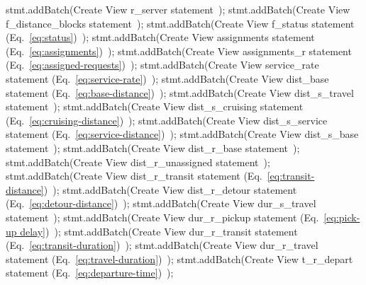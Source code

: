 \documentclass{article}
\theoremstyle{definition}                   %
\begin{document}
    stmt.addBatch(\LA{}Create View r\_server statement~{\nwtagstyle{}}\RA{});
    stmt.addBatch(\LA{}Create View f\_distance\_blocks statement~{\nwtagstyle{}}\RA{});
    stmt.addBatch(\LA{}Create View f\_status statement (Eq.~\ref{eq:status})~{\nwtagstyle{}}\RA{});
    stmt.addBatch(\LA{}Create View assignments statement (Eq.~\ref{eq:assignments})~{\nwtagstyle{}}\RA{});
    stmt.addBatch(\LA{}Create View assignments\_r statement (Eq.~\ref{eq:assigned-requests})~{\nwtagstyle{}}\RA{});
    stmt.addBatch(\LA{}Create View service\_rate statement (Eq.~\ref{eq:service-rate})~{\nwtagstyle{}}\RA{});
    stmt.addBatch(\LA{}Create View dist\_base statement (Eq.~\ref{eq:base-distance})~{\nwtagstyle{}}\RA{});
    stmt.addBatch(\LA{}Create View dist\_s\_travel statement~{\nwtagstyle{}}\RA{});
    stmt.addBatch(\LA{}Create View dist\_s\_cruising statement (Eq.~\ref{eq:cruising-distance})~{\nwtagstyle{}}\RA{});
    stmt.addBatch(\LA{}Create View dist\_s\_service statement (Eq.~\ref{eq:service-distance})~{\nwtagstyle{}}\RA{});
    stmt.addBatch(\LA{}Create View dist\_s\_base statement~{\nwtagstyle{}}\RA{});
    stmt.addBatch(\LA{}Create View dist\_r\_base statement~{\nwtagstyle{}}\RA{});
    stmt.addBatch(\LA{}Create View dist\_r\_unassigned statement~{\nwtagstyle{}}\RA{});
    stmt.addBatch(\LA{}Create View dist\_r\_transit statement (Eq.~\ref{eq:transit-distance})~{\nwtagstyle{}}\RA{});
    stmt.addBatch(\LA{}Create View dist\_r\_detour statement (Eq.~\ref{eq:detour-distance})~{\nwtagstyle{}}\RA{});
    stmt.addBatch(\LA{}Create View dur\_s\_travel statement~{\nwtagstyle{}}\RA{});
    stmt.addBatch(\LA{}Create View dur\_r\_pickup statement (Eq.~\ref{eq:pick-up delay})~{\nwtagstyle{}}\RA{});
    stmt.addBatch(\LA{}Create View dur\_r\_transit statement (Eq.~\ref{eq:transit-duration})~{\nwtagstyle{}}\RA{});
    stmt.addBatch(\LA{}Create View dur\_r\_travel statement (Eq.~\ref{eq:travel-duration})~{\nwtagstyle{}}\RA{});
    stmt.addBatch(\LA{}Create View t\_r\_depart statement (Eq.~\ref{eq:departure-time})~{\nwtagstyle{}}\RA{});
\end{document}
